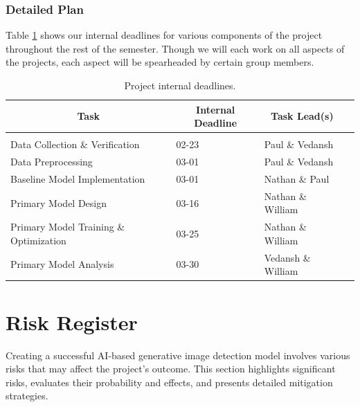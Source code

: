 \documentclass{article} %
\begin{document}
\subsubsection{Detailed Plan}
\label{detailed_plan}

Table \ref{plan_table} shows our internal deadlines for various components of the project throughout the rest of the semester. Though we will each work on all aspects of the projects, each aspect will be spearheaded by certain group members.

    \begin{table}[t]
    \caption{Project internal deadlines.}
    \label{plan_table}
    \begin{center}
    \begin{tabular}{llll}
    \multicolumn{1}{c}{\bf Task}            & \multicolumn{1}{c}{\bf Internal Deadline} & \multicolumn{1}{c}{\bf Task Lead(s)}
    \\ \hline \\
    Data Collection \& Verification         & 02-23                                     & Paul \& Vedansh \\
    Data Preprocessing                      & 03-01                                     & Paul \& Vedansh \\
    Baseline Model Implementation           & 03-01                                     & Nathan \& Paul \\                   
    Primary Model Design                    & 03-16                                     & Nathan \& William \\
    Primary Model Training \& Optimization  & 03-25                                     & Nathan \& William \\
    Primary Model Analysis                  & 03-30                                     & Vedansh \& William \\
    \end{tabular}
    \end{center}
    \end{table}
    

\section{Risk Register}
\label{risk}
Creating a successful AI-based generative image detection model involves various risks that may affect the project's outcome. This section highlights significant risks, evaluates their probability and effects, and presents detailed mitigation strategies.
\end{document}
